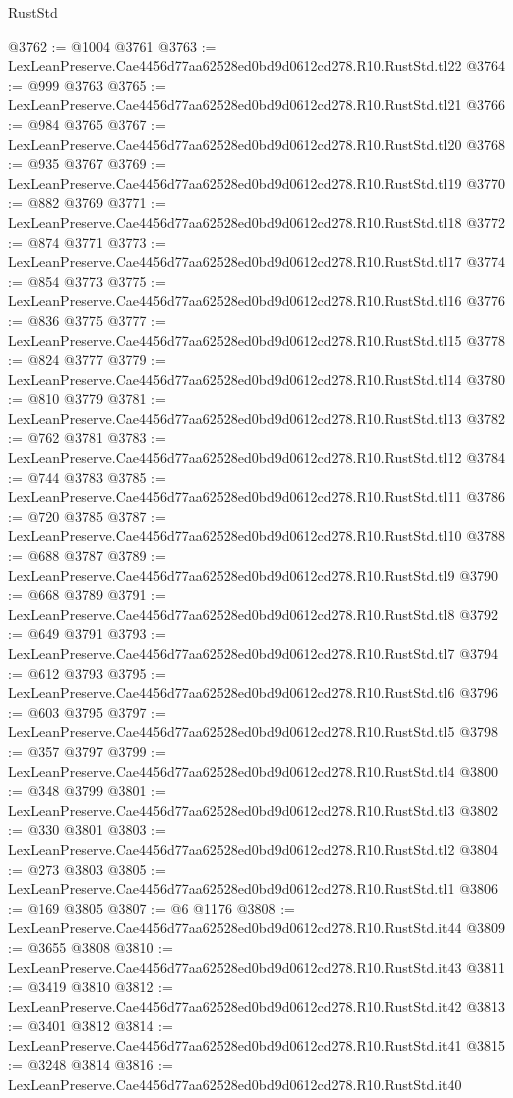 \begin{lexlean}{RustStd}
\begin{coremodule}
@3762 := @1004 @3761
@3763 := LexLeanPreserve.Cae4456d77aa62528ed0bd9d0612cd278.R10.RustStd.tl22
@3764 := @999 @3763
@3765 := LexLeanPreserve.Cae4456d77aa62528ed0bd9d0612cd278.R10.RustStd.tl21
@3766 := @984 @3765
@3767 := LexLeanPreserve.Cae4456d77aa62528ed0bd9d0612cd278.R10.RustStd.tl20
@3768 := @935 @3767
@3769 := LexLeanPreserve.Cae4456d77aa62528ed0bd9d0612cd278.R10.RustStd.tl19
@3770 := @882 @3769
@3771 := LexLeanPreserve.Cae4456d77aa62528ed0bd9d0612cd278.R10.RustStd.tl18
@3772 := @874 @3771
@3773 := LexLeanPreserve.Cae4456d77aa62528ed0bd9d0612cd278.R10.RustStd.tl17
@3774 := @854 @3773
@3775 := LexLeanPreserve.Cae4456d77aa62528ed0bd9d0612cd278.R10.RustStd.tl16
@3776 := @836 @3775
@3777 := LexLeanPreserve.Cae4456d77aa62528ed0bd9d0612cd278.R10.RustStd.tl15
@3778 := @824 @3777
@3779 := LexLeanPreserve.Cae4456d77aa62528ed0bd9d0612cd278.R10.RustStd.tl14
@3780 := @810 @3779
@3781 := LexLeanPreserve.Cae4456d77aa62528ed0bd9d0612cd278.R10.RustStd.tl13
@3782 := @762 @3781
@3783 := LexLeanPreserve.Cae4456d77aa62528ed0bd9d0612cd278.R10.RustStd.tl12
@3784 := @744 @3783
@3785 := LexLeanPreserve.Cae4456d77aa62528ed0bd9d0612cd278.R10.RustStd.tl11
@3786 := @720 @3785
@3787 := LexLeanPreserve.Cae4456d77aa62528ed0bd9d0612cd278.R10.RustStd.tl10
@3788 := @688 @3787
@3789 := LexLeanPreserve.Cae4456d77aa62528ed0bd9d0612cd278.R10.RustStd.tl9
@3790 := @668 @3789
@3791 := LexLeanPreserve.Cae4456d77aa62528ed0bd9d0612cd278.R10.RustStd.tl8
@3792 := @649 @3791
@3793 := LexLeanPreserve.Cae4456d77aa62528ed0bd9d0612cd278.R10.RustStd.tl7
@3794 := @612 @3793
@3795 := LexLeanPreserve.Cae4456d77aa62528ed0bd9d0612cd278.R10.RustStd.tl6
@3796 := @603 @3795
@3797 := LexLeanPreserve.Cae4456d77aa62528ed0bd9d0612cd278.R10.RustStd.tl5
@3798 := @357 @3797
@3799 := LexLeanPreserve.Cae4456d77aa62528ed0bd9d0612cd278.R10.RustStd.tl4
@3800 := @348 @3799
@3801 := LexLeanPreserve.Cae4456d77aa62528ed0bd9d0612cd278.R10.RustStd.tl3
@3802 := @330 @3801
@3803 := LexLeanPreserve.Cae4456d77aa62528ed0bd9d0612cd278.R10.RustStd.tl2
@3804 := @273 @3803
@3805 := LexLeanPreserve.Cae4456d77aa62528ed0bd9d0612cd278.R10.RustStd.tl1
@3806 := @169 @3805
@3807 := @6 @1176
@3808 := LexLeanPreserve.Cae4456d77aa62528ed0bd9d0612cd278.R10.RustStd.it44
@3809 := @3655 @3808
@3810 := LexLeanPreserve.Cae4456d77aa62528ed0bd9d0612cd278.R10.RustStd.it43
@3811 := @3419 @3810
@3812 := LexLeanPreserve.Cae4456d77aa62528ed0bd9d0612cd278.R10.RustStd.it42
@3813 := @3401 @3812
@3814 := LexLeanPreserve.Cae4456d77aa62528ed0bd9d0612cd278.R10.RustStd.it41
@3815 := @3248 @3814
@3816 := LexLeanPreserve.Cae4456d77aa62528ed0bd9d0612cd278.R10.RustStd.it40

\end{coremodule}
\end{lexlean}

